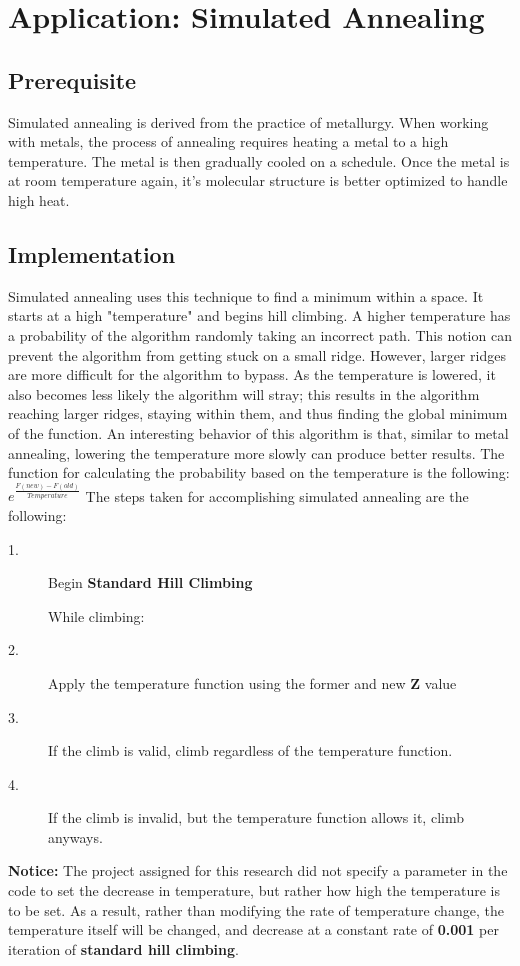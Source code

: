 \documentclass[]{report}
\begin{document}
	\chapter{Application: Simulated Annealing}
	\section{Prerequisite}
	Simulated annealing is derived from the practice of metallurgy. When working with metals, the process of annealing requires heating a metal to a high temperature. The metal is then gradually cooled on a schedule. Once the metal is at room temperature again, it's molecular structure is better optimized to handle high heat.
	\section{Implementation}
	Simulated annealing uses this technique to find a minimum within a space. It starts at a high "temperature" and begins hill climbing. A higher temperature has a probability of the algorithm randomly taking an incorrect path. This notion can prevent the algorithm from getting stuck on a small ridge. However, larger ridges are more difficult for the algorithm to bypass. As the temperature is lowered, it also becomes less likely the algorithm will stray; this results in the algorithm reaching larger ridges, staying within them, and thus finding the global minimum of the function. An interesting behavior of this algorithm is that, similar to metal annealing, lowering the temperature more slowly can produce better results. The function for calculating the probability based on the temperature is the following:
	\begin{math}
	e^{\frac{F(new) - F(old)}{Temperature}}
	\end{math}\newpage
	The steps taken for accomplishing simulated annealing are the following:
	\begin{description}
		\item[1.] Begin \textbf{Standard Hill Climbing}\\
		\item[] While climbing:
		\item[2.] Apply the temperature function using the former and new \textbf{Z} value
		\item[3.] If the climb is valid, climb regardless of the temperature function.
		\item[4.] If the climb is invalid, but the temperature function allows it, climb anyways.
	\end{description}
	\textbf{Notice:} The project assigned for this research did not specify a parameter in the code to set the decrease in temperature, but rather how high the temperature is to be set. As a result, rather than modifying the rate of temperature change, the temperature itself will be changed, and decrease at a constant rate of \textbf{0.001} per iteration of \textbf{standard hill climbing}.\newpage
\end{document}
